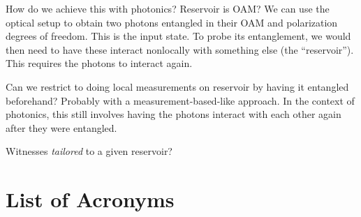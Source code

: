 \documentclass[12pt]{report}
\begin{document}
How do we achieve this with photonics? Reservoir is OAM?
We can use the optical setup to obtain two photons entangled in their OAM and polarization degrees of freedom.
This is the input state. To probe its entanglement, we would then need to have these interact nonlocally with something else (the ``reservoir'').
This requires the photons to interact again.

Can we restrict to doing local measurements on reservoir by having it entangled beforehand?
Probably with a measurement-based-like approach.
In the context of photonics, this still involves having the photons interact with each other again after they were entangled.

Witnesses \emph{tailored} to a given reservoir?


\printbibliography

\section*{List of Acronyms}
\begin{acronym}
\end{acronym}
\end{document}
